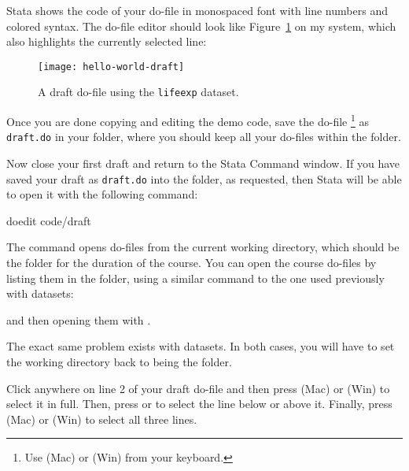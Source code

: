 \begin{description}
\begin{enumerate}
		\end{enumerate}

		Stata shows the code of your do-file in monospaced font with line numbers and colored syntax. The do-file editor should look like Figure~\ref{fig:hello-world-draft} on my system, which also highlights the currently selected line:%

		\begin{figure}%
			\texttt{[image: hello-world-draft]}%
			\caption{A draft do-file using the \texttt{lifeexp} dataset.}%
			\label{fig:hello-world-draft}%
		\end{figure}

		\item[\smallcaps{Opening and saving do-files}] Once you are done copying and editing the demo code, save the do-file%
		\footnote{Use  (Mac) or  (Win) from your keyboard.} %
		as \texttt{draft.do} in your \code folder, where you should keep all your do-files within the \SRQM folder.%
		
		Now close your first draft and return to the Stata Command window. If you have saved your draft as \texttt{draft.do} into the \code folder, as requested, then Stata will be able to open it with the following command:%

		\begin{docspec}
			doedit code/draft
		\end{docspec}
		
		The  command opens do-files from the current working directory, which should be the \SRQM folder for the duration of the course. You can open the course do-files by listing them in the \code folder, using a similar command to the one used previously with datasets:%
		
		
		 and then opening them with .%
		
		
		 The exact same problem exists with datasets. In both cases, you will have to set the working directory back to being the \SRQM folder.%

		Click anywhere on line 2 of your draft do-file and then press  (Mac) or  (Win) to select it in full. Then, press  or  to select the line below or above it. Finally, press  (Mac) or  (Win) to select all three lines.%
 

\end{description}
